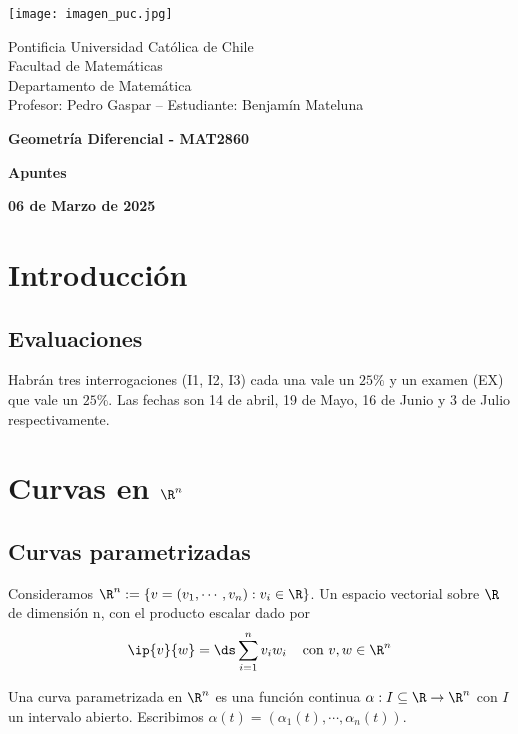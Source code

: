 \documentclass{article}
\begin{document}
\begin{minipage}{2.5cm}
    \texttt{[image: imagen\_puc.jpg]}
\end{minipage}
\begin{minipage}{14cm}
    {\sc Pontificia Universidad Católica de Chile\\
    Facultad de Matemáticas\\
    Departamento de Matemática\\
    Profesor: Pedro Gaspar -- Estudiante: Benjamín Mateluna}
\end{minipage}
\vspace{1ex}

{\centerline{\bf Geometría Diferencial - MAT2860}
\centerline{\bf Apuntes}}
\centerline{\bf 06 de Marzo de 2025}

\newpage
\tableofcontents

\newpage
\section{Introducción}
\subsection{Evaluaciones}
Habrán tres interrogaciones (I1, I2, I3) cada una vale un $25\%$ y un examen (EX) que vale un 
$25\%$. Las fechas son 14 de abril, 19 de Mayo, 16 de Junio y 3 de Julio respectivamente.

\newpage
\section{Curvas en \texorpdfstring{$\R^{n}$}{}}
\subsection{Curvas parametrizadas}
\noindent Consideramos $\R^{n}:=\{v=(v_{1},\cdots,v_{n}):v_{i}\in\R\}$. Un espacio vectorial sobre 
$\R$ de dimensión n, con el producto escalar dado por
\begin{equation*}
    \ip{v}{w}=\ds\sum_{i=1}^{n}v_{i}w_{i}\hspace{4mm}\text{con }v,w\in\R^{n}
\end{equation*}

\begin{dfn}
    Una curva parametrizada en $\R^{n}$ es una función continua $\alpha:I\subseteq\R\to\R^{n}$ con 
    $I$ un intervalo abierto. Escribimos $\alpha(t)=(\alpha_{1}(t),\cdots,\alpha_{n}(t))$.
\end{dfn}
\end{document}
